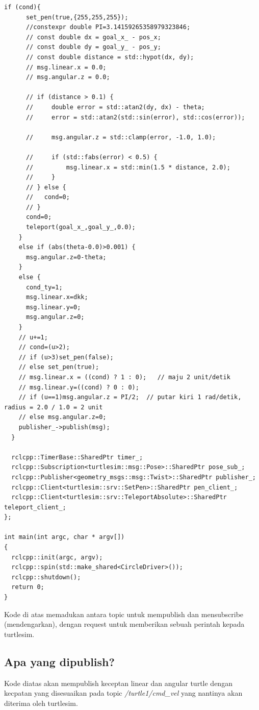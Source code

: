 \documentclass{article}
\begin{document}
\begin{lstlisting}[style=cpp, caption={Source code drawer.cpp}]
    if (cond){
      set_pen(true,{255,255,255});
      //constexpr double PI=3.14159265358979323846;
      // const double dx = goal_x_ - pos_x;
      // const double dy = goal_y_ - pos_y;
      // const double distance = std::hypot(dx, dy);
      // msg.linear.x = 0.0;
      // msg.angular.z = 0.0;

      // if (distance > 0.1) {
      //     double error = std::atan2(dy, dx) - theta;
      //     error = std::atan2(std::sin(error), std::cos(error));

      //     msg.angular.z = std::clamp(error, -1.0, 1.0);

      //     if (std::fabs(error) < 0.5) {
      //         msg.linear.x = std::min(1.5 * distance, 2.0);
      //     }
      // } else {
      //   cond=0;
      // }
      cond=0;
      teleport(goal_x_,goal_y_,0.0);
    } 
    else if (abs(theta-0.0)>0.001) {
      msg.angular.z=0-theta;
    }
    else {
      cond_ty=1;
      msg.linear.x=dkk;
      msg.linear.y=0;
      msg.angular.z=0;
    }
    // u+=1;
    // cond=(u>2);
    // if (u>3)set_pen(false);
    // else set_pen(true);
    // msg.linear.x = ((cond) ? 1 : 0);   // maju 2 unit/detik
    // msg.linear.y=((cond) ? 0 : 0);
    // if (u==1)msg.angular.z = PI/2;  // putar kiri 1 rad/detik, radius = 2.0 / 1.0 = 2 unit
    // else msg.angular.z=0;
    publisher_->publish(msg);
  }

  rclcpp::TimerBase::SharedPtr timer_;
  rclcpp::Subscription<turtlesim::msg::Pose>::SharedPtr pose_sub_;
  rclcpp::Publisher<geometry_msgs::msg::Twist>::SharedPtr publisher_;
  rclcpp::Client<turtlesim::srv::SetPen>::SharedPtr pen_client_;
  rclcpp::Client<turtlesim::srv::TeleportAbsolute>::SharedPtr teleport_client_;
};

int main(int argc, char * argv[])
{
  rclcpp::init(argc, argv);
  rclcpp::spin(std::make_shared<CircleDriver>());
  rclcpp::shutdown();
  return 0;
}
\end{lstlisting}

Kode di atas memadukan antara topic untuk mempublish dan mensubscribe (mendengarkan),
dengan request untuk memberikan sebuah perintah kepada turtlesim.

\subsection{Apa yang dipublish?}
Kode diatas akan mempublish keceptan linear dan angular turtle 
dengan kecpatan yang disesuaikan pada topic \textit{/turtle1/cmd\_vel} yang 
nantinya akan diterima oleh turtlesim.
\end{document}
